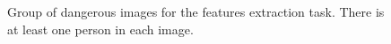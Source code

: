 \begin{figure}
    \hspace{\subfigurehspacing}
    \hspace{\subfigurehspacing}
    \vspace{0.1cm}
    \caption[Group of dangerous images for the features extraction task]
    {Group of dangerous images for the features extraction task. 
    There is at least one person in each image.}
    \label{fig:dangerous_group}
\end{figure}


